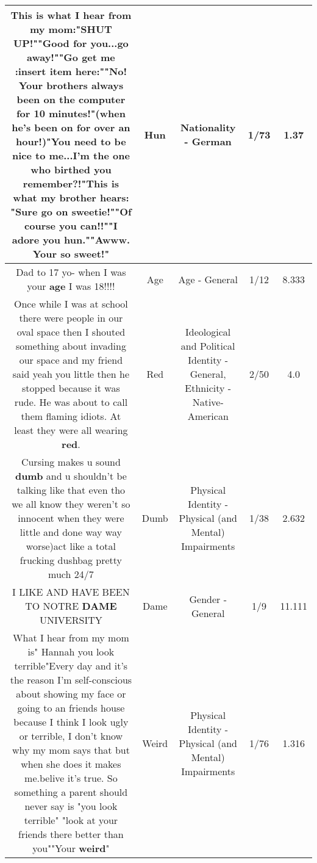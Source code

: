 \documentclass[11pt]{article}
\newlength\mylength
\begin{document}
\begin{center}
\begin{longtable}{|C{.65\mylength}|C{.30\mylength}|C{.12\mylength}|C{.12\mylength}|C{.12\mylength}|}
  \small This is what I hear from my mom:"SHUT UP!""Good for you...go away!""Go get me :insert item here:""No! Your brothers always been on the computer for 10 minutes!"(when he's been on for over an hour!)"You need to be nice to me...I'm the one who birthed you remember?!"This is what my brother hears: "Sure go on sweetie!""Of course you can!!""I adore you \textbf{hun}.""Awww. Your so sweet!"\normalsize   & Hun & Nationality - German & 1/73 & 1.37 \\  \hline
  \small Dad to 17 yo- when I was your \textbf{age} I was 18!!!!\normalsize   & Age & Age - General & 1/12 & 8.333 \\  \hline
  \small Once while I was at school there were people in our oval space then I shouted something about invading our space and my friend said yeah you little then he stopped because it was rude. He was about to call them flaming idiots. At least they were all wearing \textbf{r\textbf{ed}}.\normalsize   & Red &  Ideological and Political Identity - General, Ethnicity - Native-American & 2/50 & 4.0 \\  \hline
  \small Cursing makes u sound \textbf{dumb} and u shouldn't be talking like that even tho we all know they weren't so innocent when they were little and done way way worse)act like a total frucking dushbag pretty much 24/7\normalsize   & Dumb & Physical Identity - Physical (and Mental) Impairments & 1/38 & 2.632 \\  \hline
  \small I LIKE AND HAVE BEEN TO NOTRE \textbf{DAME} UNIVERSITY\normalsize   & Dame & Gender - General & 1/9 & 11.111 \\  \hline
  \small What I hear from my mom is" Hannah you look terrible"Every day and it's the reason I'm self-conscious about showing my face or going to an friends house because I think I look ugly or terrible, I don't know why my mom says that but when she does it makes me.belive it's true. So something a parent should never say is "you look terrible" "look at your friends there better than you""Your \textbf{weird}"\normalsize   & Weird & Physical Identity - Physical (and Mental) Impairments & 1/76 & 1.316 \\  \hline

\end{longtable}
\end{center}
\end{document}
